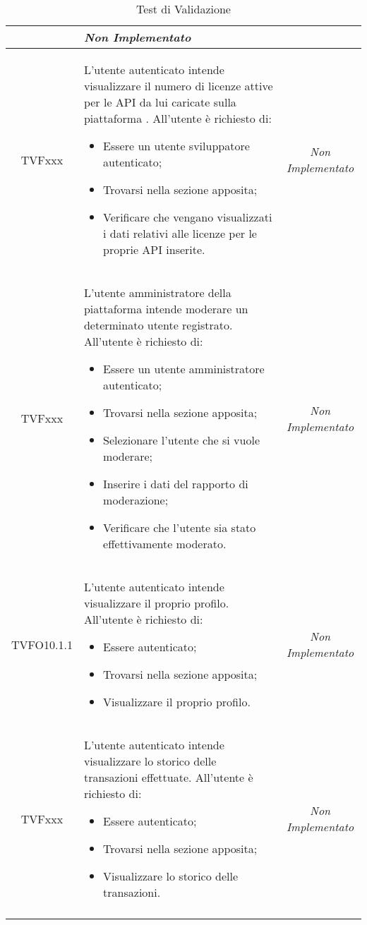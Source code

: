\begin{longtable}[ht]{|c|>{}m{8cm}|c|}
\begin{itemize}
		\end{itemize} & \textit{Non Implementato}\\ \hline
		\hypertarget{TVFxxx}{TVFxxx} & L’utente autenticato intende visualizzare il numero di licenze attive per le API da lui caricate sulla piattaforma \progetto. All’utente è richiesto di:
		\begin{itemize}
			\item Essere un utente sviluppatore autenticato;
			\item Trovarsi nella sezione apposita;
			\item Verificare che vengano visualizzati i dati relativi alle licenze per le proprie API inserite.
		\end{itemize} & \textit{Non Implementato}\\ \hline
		\hypertarget{TVFxxx}{TVFxxx} & L’utente amministratore della piattaforma \progetto intende moderare un determinato utente registrato. All’utente è richiesto di:
		\begin{itemize}
			\item Essere un utente amministratore autenticato;
			\item Trovarsi nella sezione apposita;
			\item Selezionare l'utente che si vuole moderare;
			\item Inserire i dati del rapporto di moderazione;
			\item Verificare che l'utente sia stato effettivamente moderato.
		\end{itemize} & \textit{Non Implementato}\\ \hline
		\hypertarget{TVFO10.1.1}{TVFO10.1.1} & L’utente autenticato intende visualizzare il proprio profilo. All’utente è richiesto di:
		\begin{itemize}
			\item Essere autenticato;
			\item Trovarsi nella sezione apposita;
			\item Visualizzare il proprio profilo.
		\end{itemize} & \textit{Non Implementato}\\ \hline
		\hypertarget{TVFxxx}{TVFxxx} & L’utente autenticato intende visualizzare lo storico delle transazioni effettuate. All’utente è richiesto di:
		\begin{itemize}
			\item Essere autenticato;
			\item Trovarsi nella sezione apposita;
			\item Visualizzare lo storico delle transazioni.
		\end{itemize} & \textit{Non Implementato}\\ \hline
		\caption[Test di Validazione]{Test di Validazione}
		\label{tabella:test0}
	\end{longtable}
	\clearpage
	
